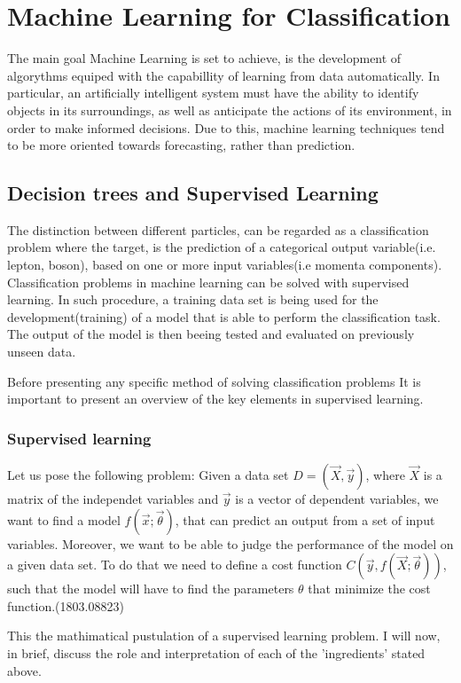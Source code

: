 \section{Machine Learning for Classification}
\label{sec:org837d169}
The main goal Machine Learning is set to achieve, is the development of algorythms equiped with the capabillity of learning from data automatically. In particular, an artificially intelligent system must have the ability to identify objects in its surroundings, as well as anticipate the actions of its environment, in order to make informed decisions. Due to this, machine learning techniques tend to be more oriented towards forecasting, rather than prediction.
\subsection{Decision trees and Supervised Learning}
\label{sec:org9e96dfd}
The distinction between different particles, can be regarded as a classification problem where the target, is the prediction of a categorical output variable(i.e. lepton, boson), based on one or more input variables(i.e momenta components). Classification problems in  machine learning can be solved with supervised learning. In such procedure, a training data set is being used for the development(training) of a model that is able to perform the classification task. The output of the model is then beeing tested and evaluated on previously unseen data.

Before presenting any specific method of solving classification problems It is important to present an overview of the key elements in supervised learning.

\subsubsection{Supervised learning}
\label{sec:orgc2bcda3}
Let us pose the following problem:
Given a data set \(D= (\vec{X}, \vec{y})\), where \(\vec{X}\) is a matrix of the independet variables and \(\vec{y}\) is a vector of dependent variables, we want to find a model \(f(\vec{x} ; \vec{\theta})\),  that can predict an output from a set of input variables. Moreover, we  want to be able to judge the performance of the model on a given data set. To do that we need to define a cost function \(C(\vec{y}, f(\vec{X}; \vec{\theta}))\), such that the model will have to find the parameters \(\theta\) that minimize the cost function.(1803.08823)

This the mathimatical pustulation of a supervised learning problem. I will now, in brief, discuss the role and interpretation of each of the 'ingredients' stated above.

